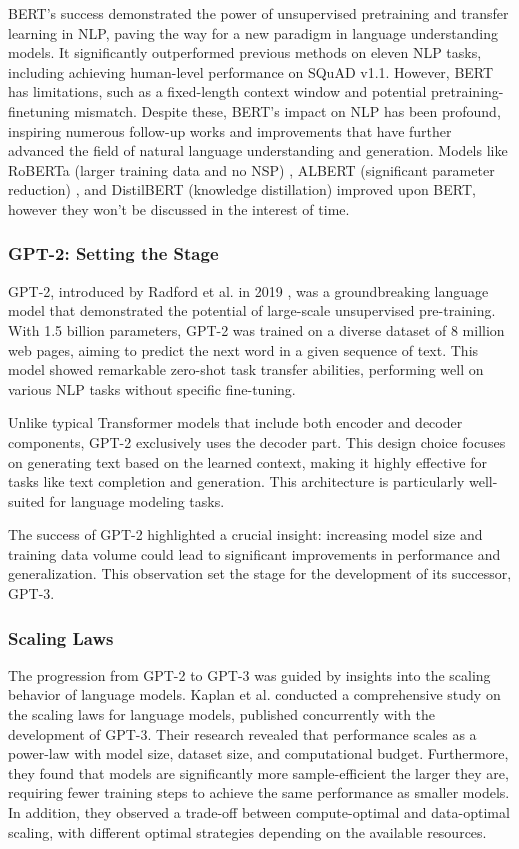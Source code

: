 \documentclass[a4paper, oneside]{discothesis}
\begin{document}
BERT's success demonstrated the power of unsupervised pretraining and transfer learning in NLP, paving the way for a new paradigm in language understanding models. 
It significantly outperformed previous methods on eleven NLP tasks, including achieving human-level performance on SQuAD v1.1. 
However, BERT has limitations, such as a fixed-length context window and potential pretraining-finetuning mismatch. 
Despite these, BERT's impact on NLP has been profound, inspiring numerous follow-up works and improvements that have further advanced the field of natural language understanding and generation.
Models like RoBERTa (larger training data and no NSP) \cite{liu2019roberta}, ALBERT (significant parameter reduction) \cite{lan2019albert}, and DistilBERT (knowledge distillation) \cite{sanh2019distilbert} improved upon BERT, however they won't be discussed in the interest of time. 



\subsubsection{GPT-2: Setting the Stage}
GPT-2, introduced by Radford et al. in 2019 \cite{radford2019language}, was a groundbreaking language model that demonstrated the potential of large-scale unsupervised pre-training. With 1.5 billion parameters, GPT-2 was trained on a diverse dataset of 8 million web pages, aiming to predict the next word in a given sequence of text. This model showed remarkable zero-shot task transfer abilities, performing well on various NLP tasks without specific fine-tuning.

Unlike typical Transformer models that include both encoder and decoder components, GPT-2 exclusively uses the decoder part. This design choice focuses on generating text based on the learned context, making it highly effective for tasks like text completion and generation. This architecture is particularly well-suited for language modeling tasks.

The success of GPT-2 highlighted a crucial insight: increasing model size and training data volume could lead to significant improvements in performance and generalization. 
This observation set the stage for the development of its successor, GPT-3.

\subsubsection{Scaling Laws}
The progression from GPT-2 to GPT-3 was guided by insights into the scaling behavior of language models. Kaplan et al. \cite{kaplan2020scaling} conducted a comprehensive study on the scaling laws for language models, published concurrently with the development of GPT-3. Their research revealed that performance scales as a power-law with model size, dataset size, and computational budget. Furthermore, they found that models are significantly more sample-efficient the larger they are, requiring fewer training steps to achieve the same performance as smaller models. In addition, they observed a trade-off between compute-optimal and data-optimal scaling, with different optimal strategies depending on the available resources.
\end{document}
